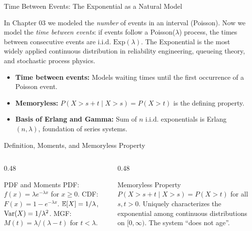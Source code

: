 \documentclass[aspectratio=169,xcolor={dvipsnames,table}]{beamer}
\begin{document}
\begin{frame}{Time Between Events: The Exponential as a Natural Model}
	\footnotesize
	\begin{motivacion}
		In Chapter 03 we modeled the \emph{number} of events in an interval (Poisson). Now we model the \emph{time between events}: if events follow a Poisson($\lambda$) process, the times between consecutive events are i.i.d. $\text{Exp}(\lambda)$. The Exponential is the most widely applied continuous distribution in reliability engineering, queueing theory, and stochastic process physics.
	\end{motivacion}
	\vspace{0.15cm}
	\pause
	\begin{itemize}\itemsep=0.1cm
		\item \textbf{Time between events:} Models waiting times until the first occurrence of a Poisson event. \pause
		\item \textbf{Memoryless:} $P(X > s + t \mid X > s) = P(X > t)$ is the defining property. \pause
		\item \textbf{Basis of Erlang and Gamma:} Sum of $n$ i.i.d. exponentials is Erlang$(n, \lambda)$, foundation of series systems.
	\end{itemize}
\end{frame}

\begin{frame}{Definition, Moments, and Memoryless Property}
	\vspace{-0.15cm}
	\begin{columns}[T]
		\begin{column}{0.48\textwidth}
			\begin{block}{PDF and Moments}
				\footnotesize
				PDF: $f(x) = \lambda e^{-\lambda x}$ for $x \ge 0$. CDF: $F(x) = 1 - e^{-\lambda x}$. $\mathbb{E}[X] = 1/\lambda$, $\operatorname{Var}(X) = 1/\lambda^{2}$. MGF: $M(t) = \lambda/(\lambda-t)$ for $t < \lambda$.
			\end{block}
		\end{column}
		\begin{column}{0.48\textwidth}
			\begin{alertblock}{Memoryless Property}
				\footnotesize
				$P(X > s + t \mid X > s) = P(X > t)$ for all $s, t > 0$. Uniquely characterizes the exponential among continuous distributions on $[0, \infty)$. The system ``does not age''.
			\end{alertblock}
		\end{column}
	\end{columns}
\end{frame}
\end{document}
